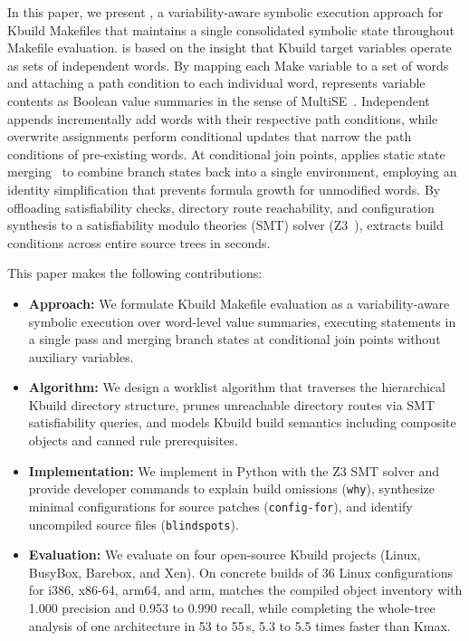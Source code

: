 \documentclass[acmsmall,screen,review,anonymous,nonacm]{acmart}
\begin{document}
  In this paper, we present \tool{}, a variability-aware symbolic execution approach for Kbuild Makefiles that maintains a single consolidated symbolic state throughout Makefile evaluation.
  \tool{} is based on the insight that Kbuild target variables operate as sets of independent words.
  By mapping each Make variable to a set of words and attaching a path condition to each individual word, \tool{} represents variable contents as Boolean value summaries in the sense of MultiSE~\cite{sen2015multise}.
  Independent appends incrementally add words with their respective path conditions, while overwrite assignments perform conditional updates that narrow the path conditions of pre-existing words.
  At conditional join points, \tool{} applies static state merging~\cite{kuznetsov2012efficient,avgerinos2014enhancing} to combine branch states back into a single environment, employing an identity simplification that prevents formula growth for unmodified words.
  By offloading satisfiability checks, directory route reachability, and configuration synthesis to a satisfiability modulo theories (SMT) solver (Z3~\cite{demoura2008z3}), \tool{} extracts build conditions across entire source trees in seconds.

  This paper makes the following contributions:
  \begin{itemize}[leftmargin=1.5em]
    \item \textbf{Approach:} We formulate Kbuild Makefile evaluation as a variability-aware symbolic execution over word-level value summaries, executing statements in a single pass and merging branch states at conditional join points without auxiliary variables.
    \item \textbf{Algorithm:} We design a worklist algorithm that traverses the hierarchical Kbuild directory structure, prunes unreachable directory routes via SMT satisfiability queries, and models Kbuild build semantics including composite objects and canned rule prerequisites.
    \item \textbf{Implementation:} We implement \tool{} in Python with the Z3 SMT solver and provide developer commands to explain build omissions (\texttt{why}), synthesize minimal configurations for source patches (\texttt{config-for}), and identify uncompiled source files (\texttt{blindspots}).
    \item \textbf{Evaluation:} We evaluate \tool{} on four open-source Kbuild projects (Linux, BusyBox, Barebox, and Xen). On concrete builds of 36 Linux configurations for i386, x86-64, arm64, and arm, \tool{} matches the compiled object inventory with 1.000 precision and 0.953 to 0.990 recall, while completing the whole-tree analysis of one architecture in 53 to 55\,s, 5.3 to 5.5 times faster than Kmax.
  \end{itemize}
\end{document}
